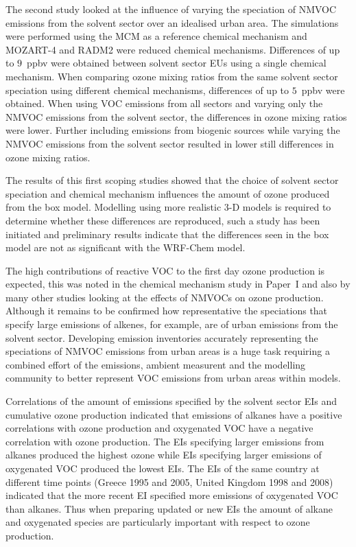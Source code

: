 The second study looked at the influence of varying the speciation of NMVOC emissions from the solvent sector over an idealised urban area.
The simulations were performed using the MCM as a reference chemical mechanism and MOZART-4 and RADM2 were reduced chemical mechanisms.
Differences of up to $9$~ppbv were obtained between solvent sector EUs using a single chemical mechanism.
When comparing ozone mixing ratios from the same solvent sector speciation using different chemical mechanisms, differences of up to $5$~ppbv were obtained.
When using VOC emissions from all sectors and varying only the NMVOC emissions from the solvent sector, the differences in ozone mixing ratios were lower.
Further including emissions from biogenic sources while varying the NMVOC emissions from the solvent sector resulted in lower still differences in ozone mixing ratios.

The results of this first scoping studies showed that the choice of solvent sector speciation and chemical mechanism influences the amount of ozone produced from the box model.
Modelling using more realistic 3-D models is required to determine whether these differences are reproduced, such a study has been initiated and preliminary results indicate that the differences seen in the box model are not as significant with the WRF-Chem model.

The high contributions of reactive VOC to the first day ozone production is expected, this was noted in the chemical mechanism study in Paper~I and also by many other studies looking at the effects of NMVOCs on ozone production.
Although it remains to be confirmed how representative the speciations that specify large emissions of alkenes, for example, are of urban emissions from the solvent sector.
Developing emission inventories accurately representing the speciations of NMVOC emissions from urban areas is a huge task requiring a combined effort of the emissions, ambient measurent and the modelling community to better represent VOC emissions from urban areas within models.

Correlations of the amount of emissions specified by the solvent sector EIs and cumulative ozone production indicated that emissions of alkanes have a positive correlations with ozone production and oxygenated VOC have a negative correlation with ozone production.
The EIs specifying larger emissions from alkanes produced the highest ozone while EIs specifying larger emissions of oxygenated VOC produced the lowest EIs.
The EIs of the same country at different time points (Greece 1995 and 2005, United Kingdom 1998 and 2008) indicated that the more recent EI specified more emissions of oxygenated VOC than alkanes.
Thus when preparing updated or new EIs the amount of alkane and oxygenated species are particularly important with respect to ozone production.

